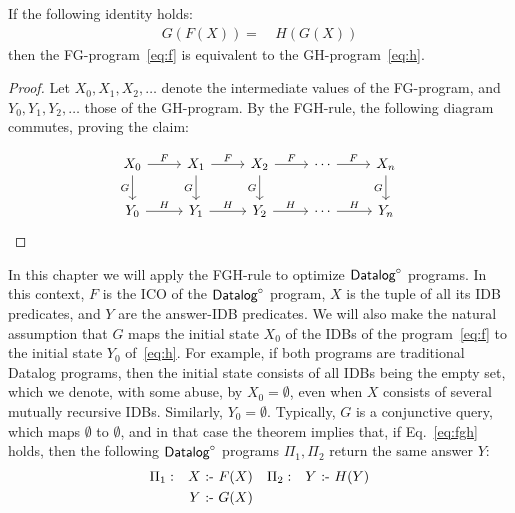 \begin{thm}\label{th:fgh} If the following identity
  holds:
%
  \begin{align}
    G(F(X)) = & \ H(G(X)) \label{eq:fgh}
  \end{align}
%
  then the FG-program~\eqref{eq:f} is equivalent to the
  GH-program~\eqref{eq:h}.
%
\end{thm}
%
\begin{proof}
  Let $X_0, X_1, X_2, \ldots$ denote the intermediate values of the
  FG-program, and $Y_0, Y_1, Y_2, \ldots$ those of the GH-program.
  By the FGH-rule,  the following diagram commutes, proving
  the claim:

\[\begin{tikzcd}
	{X_0} & {X_1} & {X_2} & \cdots & {X_n} \\
	{Y_0} & {Y_1} & {Y_2} & \cdots & {Y_n}
	\arrow["F", from=1-1, to=1-2]
	\arrow["G"', from=1-1, to=2-1]
	\arrow["H", from=2-1, to=2-2]
	\arrow["G"', from=1-2, to=2-2]
	\arrow["F", from=1-2, to=1-3]
	\arrow["H", from=2-2, to=2-3]
	\arrow["G"', from=1-3, to=2-3]
	\arrow["F", from=1-3, to=1-4]
	\arrow["H", from=2-3, to=2-4]
	\arrow["G"', from=1-5, to=2-5]
	\arrow["F", from=1-4, to=1-5]
	\arrow["H", from=2-4, to=2-5]
\end{tikzcd}\]
\end{proof}

In this chapter we will apply the FGH-rule to optimize $\text{\sf Datalog}^\circ$ programs.
In this context, $F$ is the ICO of the $\text{\sf Datalog}^\circ$ program, $X$ is the
tuple of all its IDB predicates, and $Y$ are the answer-IDB
predicates.  We will also make the natural assumption that $G$ maps
the initial state $X_0$ of the IDBs of the program~\eqref{eq:f} to the
initial state $Y_0$ of~\eqref{eq:h}.  For example, if both programs
are traditional Datalog programs, then the initial state consists of
all IDBs being the empty set, which we denote, with some abuse, by
$X_0 = \emptyset$, even when $X$ consists of several mutually
recursive IDBs.  Similarly, $Y_0=\emptyset$. Typically, $G$ is a
conjunctive query, which maps $\emptyset$ to $\emptyset$, and in that
case the theorem implies that, if Eq.~\eqref{eq:fgh} holds, then the
following $\text{\sf Datalog}^\circ$ programs $\Pi_1, \Pi_2$ return the same answer $Y$:
\begin{align}
\Pi_1: &&  X \text{ :- } & F(X) & \Pi_2: && Y \text{ :- } & H(Y) \nonumber \\
     &&  Y \text{ :- } & G(X) \label{eq:p1:p2}
\end{align}

